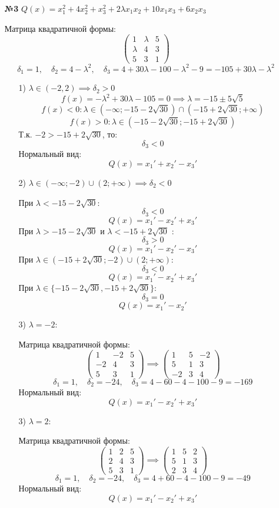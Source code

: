 \documentclass[a4paper]{article}
\newcommand{\mat}[1]{\begin{pmatrix} #1 \end{pmatrix}}
\begin{document}
\begin{enumerate}
    \item[\textbf{№3}]$Q(x) = x_1^2 + 4x_2^2 + x_3^2 + 2\lambda x_1x_2 + 10x_1x_3 + 6x_2x_3$
    
    Матрица квадратичной формы:
    $$\mat{
        1 & \lambda & 5 \\
        \lambda & 4 & 3\\
        5 & 3 & 1
    }$$
    $$\delta_1 = 1, \quad \delta_2 = 4-\lambda^2, \quad \delta_3 = 4+30\lambda-100-\lambda^2-9 = -105+30\lambda -\lambda^2$$
    \begin{enumerate}
        \item[1)] $\lambda \in (-2, 2) \implies \delta_2 > 0$
        $$f(x) = -\lambda^2 + 30 \lambda-105 = 0 \implies \lambda = -15 \pm 5\sqrt{5}$$
        $$f(x) < 0 : \lambda \in (-\infty; -15-2\sqrt{30})\cap (-15+2\sqrt{30};+\infty)$$
        $$f(x) > 0 : \lambda \in (-15-2\sqrt{30}; -15+2\sqrt{30})$$
        Т.к. $-2 > -15+2\sqrt{30}$, то:
        $$\delta_3 < 0 $$
        Нормальный вид:
        $$Q(x) = x_1' + x_2' - x_3'$$
        \item[2)] $\lambda \in (-\infty;-2)\cup(2;+\infty) \implies \delta_2 < 0$
        
        При $\lambda < -15-2\sqrt{30}$:
        $$\delta_3 < 0$$
        $$Q(x) = x_1' - x_2' + x_3'$$
        При $\lambda > -15-2\sqrt{30}$ и $\lambda < -15+2\sqrt{30}$ :
        $$\delta_3 > 0$$
        $$Q(x) = x_1' - x_2' - x_3'$$
        При $\lambda \in (-15+2\sqrt{30};-2) \cup (2;+\infty)$:
        $$\delta_3 < 0$$
        $$Q(x) = x_1' - x_2' + x_3'$$
        При $\lambda \in \{-15-2\sqrt{30}, -15+2\sqrt{30}\}$:
        $$\delta_3 = 0$$
        $$Q(x) = x_1' - x_2'$$

        \item[3)]$\lambda = -2 $:
        
        Матрица квадратичной формы:
        $$\mat{
            1 & -2 & 5 \\
            -2 & 4 & 3\\
            5 & 3 & 1
        } \implies \mat{
            1 & 5& -2  \\
            5  & 1& 3 \\
            -2& 3 & 4 
        }$$
        $$\delta_1 = 1, \quad \delta_2 = -24, \quad \delta_3 = 4-60-4-100-9 = -169$$
        Нормальный вид:
        $$Q(x) = x_1' -x_2'+x_3'$$

        \item[3)]$\lambda = 2 $:
        
        Матрица квадратичной формы:
        $$\mat{
            1 & 2 & 5 \\
            2 & 4 & 3\\
            5 & 3 & 1
        } \implies \mat{
            1 & 5& 2  \\
            5  & 1& 3 \\
            2& 3 & 4 
        }$$
        $$\delta_1 = 1, \quad \delta_2 = -24, \quad \delta_3 = 4+60-4-100-9 = -49$$
        Нормальный вид:
        $$Q(x) = x_1' -x_2'+x_3'$$
    \end{enumerate}


\end{enumerate}
\end{document}
